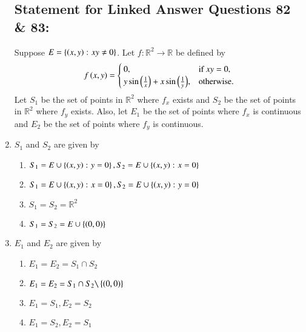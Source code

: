 \documentclass[journal]{IEEEtran}
\begin{document}
\begin{enumerate}
\subsection*{Statement for Linked Answer Questions 82 \& 83:}
Suppose $E = \left\{\left(x,y\right) \colon xy \neq 0\right\}$. Let $f \colon \mathbb{R}^2 \rightarrow \mathbb{R}$ be defined by
\begin{align*}
    f\left(x,y\right) =
    \begin{cases}
        0, & \text{if } xy = 0,\\
        y \sin{\ensuremath{\left(\frac{1}{x}\right)}} + x \sin{\ensuremath{\left(\frac{1}{y}\right)}}, & \text{otherwise.}
    \end{cases}
\end{align*}
Let $S_1$ be the set of points in $\mathbb{R}^2$ where $f_x$ exists and $S_2$ be the set of points in $\mathbb{R}^2$ where $f_y$ exists. Also, let $E_1$ be the set of points where $f_x$ is continuous and $E_2$ be the set of points where $f_y$ is continuous.
\item $S_1$ and $S_2$ are given by
\begin{enumerate}
    \item $S_1 = E \cup \left\{\left(x,y\right)\colon y=0\right\}, S_2 = E \cup \left\{\left(x,y\right)\colon x=0\right\}$
    \item $S_1 = E \cup \left\{\left(x,y\right)\colon x=0\right\}, S_2 = E \cup \left\{\left(x,y\right)\colon y=0\right\}$
    \item $S_1 = S_2 = \mathbb{R}^2$
    \item $S_1 = S_2 = E \cup \left\{\left(0,0\right)\right\}$
\end{enumerate}
\item $E_1$ and $E_2$ are given by
\begin{multicols}{2}
    \begin{enumerate}
        \item $E_1 = E_2 = S_1 \cap S_2$
        \item $E_1 = E_2 = S_1 \cap S_2 \verb|\| \cbrak{\brak{0,0}}$
        \item $E_1 = S_1, E_2 = S_2$
        \item $E_1 = S_2, E_2 = S_1$
    \end{enumerate}
\end{multicols}


\end{enumerate}
\end{document}
